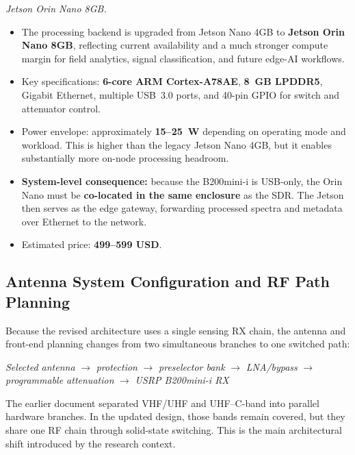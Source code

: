 \documentclass[11pt,a4paper]{article}
\newcommand{\blue}[1]{\textcolor{priceblue}{\textbf{#1}}}
\begin{document}
\noindent
\textit{Jetson Orin Nano 8GB.}
\begin{itemize}
	\item The processing backend is upgraded from Jetson Nano 4GB to
	\textbf{Jetson Orin Nano 8GB}, reflecting current availability and a much
	stronger compute margin for field analytics, signal classification, and future
	edge-AI workflows.
	\item Key specifications: \textbf{6-core ARM Cortex-A78AE}, \textbf{8~GB LPDDR5},
	Gigabit Ethernet, multiple USB~3.0 ports, and 40-pin GPIO for switch and
	attenuator control.
	\item Power envelope: approximately \textbf{15--25~W} depending on operating
	mode and workload. This is higher than the legacy Jetson Nano 4GB, but it
	enables substantially more on-node processing headroom.
	\item \textbf{System-level consequence:} because the B200mini-i is USB-only, the
	Orin Nano must be \textbf{co-located in the same enclosure} as the SDR. The
	Jetson then serves as the edge gateway, forwarding processed spectra and
	metadata over Ethernet to the network.
	\item Estimated price: \blue{499--599 USD}.
\end{itemize}

\subsection*{Antenna System Configuration and RF Path Planning}

Because the revised architecture uses a single sensing RX chain, the antenna and
front-end planning changes from two simultaneous branches to one switched path:
\begin{center}
\small
\textit{Selected antenna}
\(\rightarrow\)
\textit{protection}
\(\rightarrow\)
\textit{preselector bank}
\(\rightarrow\)
\textit{LNA/bypass}
\(\rightarrow\)
\textit{programmable attenuation}
\(\rightarrow\)
\textit{USRP B200mini-i RX}
\end{center}

The earlier document separated VHF/UHF and UHF--C-band into parallel hardware
branches. In the updated design, those bands remain covered, but they share one
RF chain through solid-state switching. This is the main architectural shift
introduced by the research context.

\begin{center}
\end{center}
\end{document}
